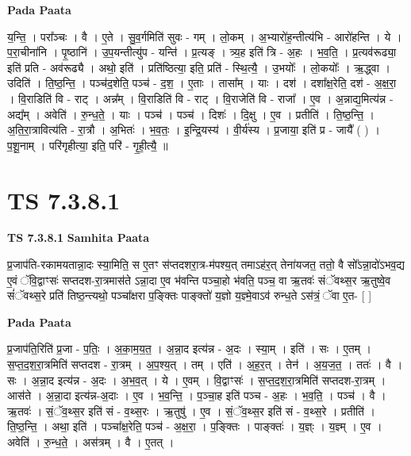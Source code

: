 \documentclass[17pt]{extarticle}
\begin{document}
\textbf{Pada Paata} \newline

य॒न्ति॒ । परा᳚ञ्चः । वै । ए॒ते । सु॒व॒र्गमिति॑ सुवः - गम् । लो॒कम् । अ॒भ्यारो॑ह॒न्तीत्य॑भि - आरो॑हन्ति । ये । प॒रा॒चीना॑नि । पृ॒ष्ठानि॑ । उ॒प॒यन्तीत्यु॑प - यन्ति॑ । प्र॒त्यङ् । त्र्य॒ह इति॑ त्रि - अ॒हः । भ॒व॒ति॒ । प्र॒त्यव॑रूढ्या॒ इति॑ प्रति - अव॑रूढ्यै । अथो॒ इति॑ । प्रति॑ष्ठित्या॒ इति॒ प्रति॑ - स्थि॒त्यै॒ । उ॒भयोः᳚ । लो॒कयोः᳚ । ऋ॒द्ध्वा । उदिति॑ । ति॒ष्ठ॒न्ति॒ । पञ्च॑द॒शेति॒ पञ्च॑ - द॒श॒ । ए॒ताः । तासा᳚म् । याः । दश॑ । दशा᳚क्ष॒रेति॒ दश॑ - अ॒क्ष॒रा॒ । वि॒राडिति॑ वि - राट् । अन्न᳚म् । वि॒राडिति॑ वि - राट् । वि॒राजेति॑ वि - राजा᳚ । ए॒व । अ॒न्नाद्य॒मित्य॑न्न - अद्य᳚म् । अवेति॑ । रु॒न्ध॒ते॒ । याः । पञ्च॑ । पञ्च॑ । दिशः॑ । दि॒क्षु । ए॒व । प्रतीति॑ । ति॒ष्ठ॒न्ति॒ । अ॒ति॒रा॒त्रावित्य॑ति - रा॒त्रौ । अ॒भितः॑ । भ॒व॒तः॒ । इ॒न्द्रि॒यस्य॑ । वी॒र्य॑स्य । प्र॒जाया॒ इति॑ प्र - जायै᳚ ( ) । प॒शू॒नाम् । परि॑गृहीत्या॒ इति॒ परि॑ - गृ॒ही॒त्यै॒ ॥  \newline





\section{ TS 7.3.8.1 }

\textbf{TS 7.3.8.1 } \newline
\textbf{Samhita Paata} \newline

प्र॒जाप॑ति-रकामयतान्ना॒दः स्या॒मिति॒ स ए॒तꣳ स॑प्तदशरा॒त्र-म॑पश्य॒त् तमाऽह॑र॒त् तेना॑यजत॒ ततो॒ वै सो᳚ऽन्ना॒दो॑ऽभव॒द्य ए॒वं ॅवि॒द्वाꣳसः॑ सप्तदश-रा॒त्रमास॑ते ऽन्ना॒दा ए॒व भ॑वन्ति पञ्चा॒हो भ॑वति॒ पञ्च॒ वा ऋ॒तवः॑ संॅवथ्स॒र ऋ॒तुष्वे॒व सं॑ॅवथ्स॒रे प्रति॑ तिष्ठ॒न्त्यथो॒ पञ्चा᳚क्षरा प॒ङ्क्तिः पाङ्क्तो॑ य॒ज्ञो य॒ज्ञ्मे॒वाऽव॑ रुन्ध॒ते ऽस॑त्रं॒ ॅवा ए॒त- [  ] \newline

\textbf{Pada Paata} \newline

प्र॒जाप॑ति॒रिति॑ प्र॒जा - प॒तिः॒ । अ॒का॒म॒य॒त॒ । अ॒न्ना॒द इत्य॑न्न - अ॒दः । स्या॒म् । इति॑ । सः । ए॒तम् । स॒प्त॒द॒श॒रा॒त्रमिति॑ सप्तदश - रा॒त्रम् । अ॒प॒श्य॒त् । तम् । एति॑ । अ॒ह॒र॒त् । तेन॑ । अ॒य॒ज॒त॒ । ततः॑ । वै । सः । अ॒न्ना॒द इत्य॑न्न - अ॒दः । अ॒भ॒व॒त् । ये । ए॒वम् । वि॒द्वाꣳसः॑ । स॒प्त॒द॒श॒रा॒त्रमिति॑ सप्तदश-रा॒त्रम् । आस॑ते । अ॒न्ना॒दा इत्य॑न्न-अ॒दाः । ए॒व । भ॒व॒न्ति॒ । प॒ञ्चा॒ह इति॑ पञ्च - अ॒हः । भ॒व॒ति॒ । पञ्च॑ । वै । ऋ॒तवः॑ । सं॒ॅव॒थ्स॒र इति॑ सं - व॒थ्स॒रः । ऋ॒तुषु॑ । ए॒व । सं॒ॅव॒थ्स॒र इति॑ सं - व॒थ्स॒रे । प्रतीति॑ । ति॒ष्ठ॒न्ति॒ । अथा॒ इति॑ । पञ्चा᳚क्ष॒रेति॒ पञ्च॑ - अ॒क्ष॒रा॒ । प॒ङ्क्तिः । पाङ्क्तः॑ । य॒ज्ञ्ः । य॒ज्ञ्म् । ए॒व । अवेति॑ । रु॒न्ध॒ते॒ । अस॑त्रम् । वै । ए॒तत् ।  \newline
\end{document}
